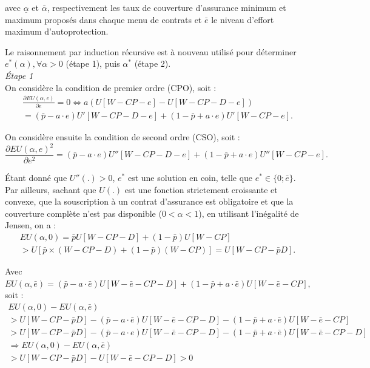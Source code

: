 \begin{Article}
\begin{refsection}[Mouminoux]
\begin{appendices}
\noindent avec $\underline{\alpha}$ et $\bar{\alpha}$, respectivement les taux de couverture d'assurance minimum et maximum proposés dans chaque menu de contrats et $\bar{e}$ le niveau d'effort maximum d'autoprotection.

Le raisonnement par induction récursive est à nouveau utilisé pour déterminer $e^*(\alpha), \forall\alpha>0$ (étape 1), puis $\alpha^*$ (étape 2). \\

\textit{Étape 1} \\

On considère la condition de premier ordre (CPO), soit :
\begin{multline}
\frac{\partial EU(\alpha, e)}{\partial e}=0\Leftrightarrow a(U[W - CP -e] -U[W - CP -D -e]) \\
=(\bar{p}-a\cdot e)U'[W - CP -D -e]+(1 - \bar{p}+a\cdot e)U'[W - CP -e].
\end{multline}

On considère ensuite la condition de second ordre (CSO), soit :
\begin{equation}
\frac{\partial EU(\alpha, e)^2}{\partial e^2}=(\bar{p}-a\cdot e)U''[W - CP -D -e]+(1 - \bar{p}+a\cdot e)U''[W - CP -e].
\end{equation}

Étant donné que $U''(.)>0$, $e^*$ est une solution en coin, telle que $e^* \in \{0;\bar{e}\}$.
Par ailleurs, sachant que $U(.)$ est une fonction strictement croissante et convexe, que la souscription à un contrat d'assurance est obligatoire et que la couverture complète n'est pas disponible ($0<\alpha<1$), en utilisant l'inégalité de Jensen, on a :
\begin{multline}
EU(\alpha, 0)= \bar{p}U[W  -CP - D] + (1 - \bar{p})U[W - CP] \\
> U[\bar{p}\times (W  -CP -D) + (1 - \bar{p}) (W - CP)] = U[W-CP-\bar pD].
\end{multline}

Avec $EU(\alpha, \bar e)=(\bar{p}-a\cdot \bar e)U[W - \bar e -CP - D] + (1 - \bar{p}+a\cdot \bar e)U[W - \bar e - CP],$ soit :
\begin{multline}
EU(\alpha, 0)-EU(\alpha, \bar e) \\
> U[W-CP-\bar pD]-(\bar{p}-a\cdot \bar e)U[W - \bar e -CP - D]- (1 - \bar{p}+a\cdot \bar e)U[W - \bar e - CP] \\
> U[W-CP-\bar pD]-(\bar{p}-a\cdot e)U[W - \bar e -CP - D]- (1 - \bar{p}+a\cdot \bar e)U[W - \bar e - CP-D] \\ 
\Rightarrow EU(\alpha, 0)-EU(\alpha, \bar e) \\
>U[W-CP-\bar pD]-U[W - \bar e -CP - D]>0
\end{multline}


\end{appendices}
\end{refsection}
\end{Article}
